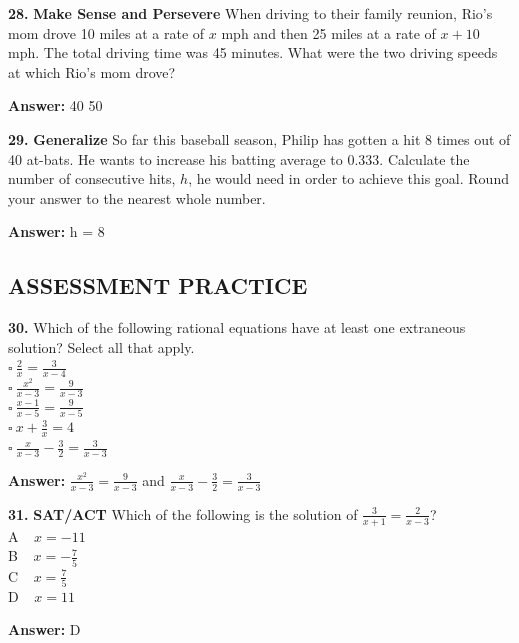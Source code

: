 \documentclass{article}
\newenvironment{practice}[2]{\textbf{#1.}}{\vspace{1em}}
\newcommand{\answer}[1]{\par\textbf{Answer:} #1}
\begin{document}
\begin{practice}{28}{DOK}
\textbf{Make Sense and Persevere} When driving to their family reunion, Rio's mom drove 10 miles at a rate of $x$ mph and then 25 miles at a rate of $x + 10$ mph. The total driving time was 45 minutes. What were the two driving speeds at which Rio's mom drove?
\answer{40  50 }
\end{practice}

\begin{practice}{29}{DOK}
\textbf{Generalize} So far this baseball season, Philip has gotten a hit 8 times out of 40 at-bats. He wants to increase his batting average to 0.333. Calculate the number of consecutive hits, $h$, he would need in order to achieve this goal. Round your answer to the nearest whole number.
\answer{h = 8}
\end{practice}

\subsection*{ASSESSMENT PRACTICE}
\begin{practice}{30}{DOK}
Which of the following rational equations have at least one extraneous solution? Select all that apply. \\
$\square \ \frac{2}{x} = \frac{3}{x-4}$ \\
$\square \ \frac{x^2}{x-3} = \frac{9}{x-3}$ \\
$\square \ \frac{x-1}{x-5} = \frac{9}{x-5}$ \\
$\square \ x + \frac{3}{x} = 4$ \\
$\square \ \frac{x}{x-3} - \frac{3}{2} = \frac{3}{x-3}$
\answer{$\frac{x^2}{x-3} = \frac{9}{x-3}$ and $\frac{x}{x-3} - \frac{3}{2} = \frac{3}{x-3}$}
\end{practice}

\begin{practice}{31}{DOK}
\textbf{SAT/ACT} Which of the following is the solution of $\frac{3}{x+1} = \frac{2}{x-3}$? \\
\textcircled{A} \ $x = -11$ \\
\textcircled{B} \ $x = -\frac{7}{5}$ \\
\textcircled{C} \ $x = \frac{7}{5}$ \\
\textcircled{D} \ $x = 11$
\answer{D}
\end{practice}
\end{document}
